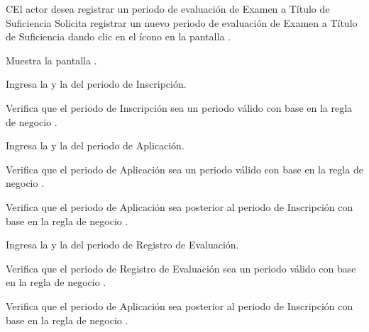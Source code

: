 
\begin{UCtrayectoriaA}{C}{El actor desea registrar un periodo de evaluación de Examen a Título de Suficiencia}
	\UCpaso [\UCactor]  \label{IN-DAE-CU1.1:solicitarC} Solicita registrar un nuevo periodo de evaluación de Examen a Título de Suficiencia dando clic en el ícono {\IUAdd} en la pantalla .
	
	\UCpaso Muestra la pantalla .
	
	\UCpaso [\UCactor]  \label{IN-DAE-CU1.1:ingresarInsC} Ingresa la  y la  del periodo de Inscripción.
	
	\UCpaso Verifica que el periodo de Inscripción sea un periodo válido con base en la regla de negocio . 
	
	\UCpaso [\UCactor]  \label{IN-DAE-CU1.1:ingresarAplC} Ingresa la  y la  del periodo de Aplicación.
	
	\UCpaso Verifica que el periodo de Aplicación sea un periodo válido con base en la regla de negocio . 
	
	\UCpaso Verifica que el periodo de Aplicación sea posterior al periodo de Inscripción con base en la regla de negocio . 
	
	\UCpaso [\UCactor]  \label{IN-DAE-CU1.1:ingresarEvalC} Ingresa la  y la  del periodo de Registro de Evaluación.
	
	\UCpaso Verifica que el periodo de Registro de Evaluación sea un periodo válido con base en la regla de negocio . 
	
	\UCpaso Verifica que el periodo de Aplicación sea posterior al periodo de Inscripción con base en la regla de negocio . 
	
\end{UCtrayectoriaA}